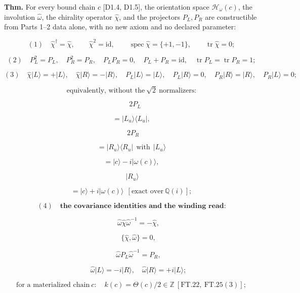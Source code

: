 \begin{theorem}\label{tag:FT-122}
\textbf{Thm.} For every bound chain $c$ [D1.4, D1.5], the orientation space $\mathcal H_\omega(c)$, the involution $\hat\omega$, the chirality operator $\hat\chi$, and the projectors $P_L,P_R$ are constructible from Parts 1–2 data alone, with no new axiom and no declared parameter:

\[
(1)\quad \hat\chi^\dagger=\hat\chi,\qquad \hat\chi^2=\mathrm{id},\qquad \operatorname{spec}\hat\chi=\{+1,-1\},\qquad\operatorname{tr}\hat\chi=0;
\]

\[
(2)\quad P_L^2=P_L,\quad P_R^2=P_R,\quad P_LP_R=0,\quad P_L+P_R=\mathrm{id},\quad \operatorname{tr}P_L=\operatorname{tr}P_R=1;
\]

\[
(3)\quad \hat\chi|L\rangle=+|L\rangle,\quad \hat\chi|R\rangle=-|R\rangle,\quad P_L|L\rangle=|L\rangle,\quad P_L|R\rangle=0,\quad P_R|R\rangle=|R\rangle,\quad P_R|L\rangle=0;
\]

\[
\text{equivalently, without the}\ \sqrt2\ \text{normalizers:}
\]

\[
\quad 2P_L
\]

\[
= |L_u\rangle\langle L_u|,
\]

\[
\ \ 2P_R
\]

\[
= |R_u\rangle\langle R_u|\ \ \text{with}\ \ |L_u\rangle
\]

\[
= |c\rangle-i|\omega(c)\rangle,
\]

\[
\ |R_u\rangle
\]

\[
= |c\rangle+i|\omega(c)\rangle\ \ [\text{exact over}\ \mathbb Q(i)];
\]

\[
(4)\quad\textbf{the covariance identities and the winding read:}
\]

\[
\qquad \hat\omega\hat\chi\hat\omega^{-1}=-\hat\chi,
\]

\[
\qquad \{\hat\chi,\hat\omega\}=0,
\]

\[
\qquad \hat\omega P_L\hat\omega^{-1}=P_R,
\]

\[
\qquad \hat\omega|L\rangle=-i|R\rangle,\quad\hat\omega|R\rangle=+i|L\rangle;
\]

\[
\text{for a materialized chain}\ c:\quad k(c)=\Theta(c)/2\in\mathbb Z\ [\mathrm{FT.22},\ \mathrm{FT.25}(3)];
\]


\end{theorem}
